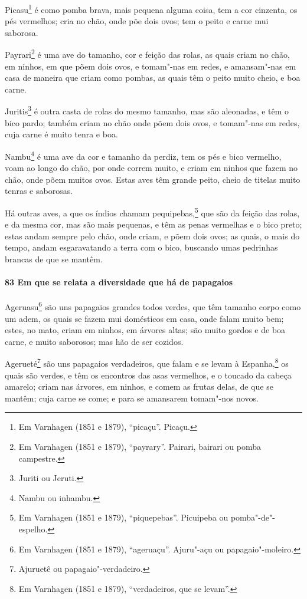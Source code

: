 Picasu\footnote{ Em Varnhagen (1851 e 1879), ``picaçu''. Picaçu.} é como pomba brava, mais
pequena alguma coisa, tem a cor cinzenta, os pés vermelhos; cria no chão, onde põe dois
ovos; tem o peito e carne mui saborosa.

Payrari\footnote{ Em Varnhagen (1851 e 1879), ``payrary''. Pairari, bairari ou pomba
campestre.} é uma ave do tamanho, cor e feição das rolas, as quais criam no chão, em
ninhos, em que põem dois ovos, e tomam"-nas em redes, e amansam"-nas em casa de maneira que
criam como pombas, as quais têm o peito muito cheio, e boa carne.

Juritis\footnote{ Juriti ou Jeruti.} é outra casta de rolas do mesmo tamanho, mas são
aleonadas, e têm o bico pardo; também criam no chão onde põem dois ovos, e tomam"-nas em
redes, cuja carne é muito tenra e boa.

Nambu\footnote{ Nambu ou inhambu.} é uma ave da cor e tamanho da perdiz, tem os pés e bico
vermelho, voam ao longo do chão, por onde correm muito, e criam em ninhos que fazem no
chão, onde põem muitos ovos. Estas aves têm grande peito, cheio de titelas muito tenras e
saborosas.

Há outras aves, a que os índios chamam pequipebas,\footnote{ Em Varnhagen (1851 e 1879),
``piquepebas''. Picuipeba ou pomba"-de"-espelho.} que são da feição das rolas, e da mesma
cor, mas são mais pequenas, e têm as penas vermelhas e o bico preto; estas andam sempre
pelo chão, onde criam, e põem dois ovos; as quais, o mais do tempo, andam esgaravatando a
terra com o bico, buscando umas pedrinhas brancas de que se mantêm.

\paragraph{83 Em que se relata a diversidade que há de papagaios}

Ageruasu\footnote{ Em Varnhagen (1851 e 1879), ``ageruaçu''. Ajuru"-açu ou
papagaio"-moleiro.} são uns papagaios grandes todos verdes, que têm tamanho corpo como um
adem, os quais se fazem mui domésticos em casa, onde falam muito bem; estes, no mato,
criam em ninhos, em árvores altas; são muito gordos e de boa carne, e muito saborosos; mas
hão de ser cozidos.

Agerueté\footnote{ Ajuruetê ou papagaio"-verdadeiro.} são uns papagaios verdadeiros, que
falam e se levam à Espanha,\footnote{ Em Varnhagen (1851 e 1879), ``verdadeiros, que se
levam''.} os quais são verdes, e têm os encontros das asas vermelhos, e o toucado da
cabeça amarelo; criam nas árvores, em ninhos, e comem as frutas delas, de que se mantêm;
cuja carne se come; e para se amansarem tomam"-nos novos.

